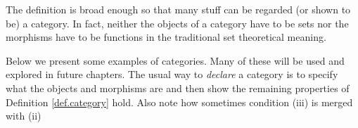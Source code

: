 \begin{remark}
    The definition is broad enough so that many stuff can be regarded (or shown to be) a category. In fact, neither  the objects of a category  have to be sets nor the morphisms have to be functions in the traditional set theoretical meaning. 
\end{remark}

Below we present some examples of categories. Many of these will be used and explored in future chapters. The usual way to \textit{declare} a category is to specify what  the objects and morphisms are and then show the remaining properties of Definition \ref{def.category} hold. 
Also note how sometimes condition (iii) is merged with (ii)

